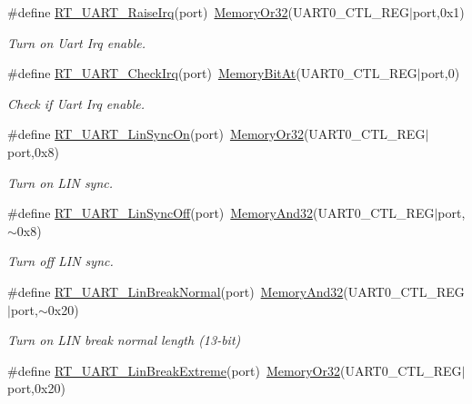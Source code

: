 \begin{DoxyCompactItemize}
\#define \mbox{\hyperlink{a00056_ad8934a303c429b70176995f2dd6ac67b}{R\+T\+\_\+\+U\+A\+R\+T\+\_\+\+Raise\+Irq}}(port)~\mbox{\hyperlink{a00020_a9ea92ebccdef6bdaca4d00210cc7266d}{Memory\+Or32}}(U\+A\+R\+T0\+\_\+\+C\+T\+L\+\_\+\+R\+EG$\vert$port,0x1)
\begin{DoxyCompactList}\small\item\em Turn on Uart Irq enable. \end{DoxyCompactList}\item 
\#define \mbox{\hyperlink{a00056_a3e29e879f76b82a13419f4d59a1c3053}{R\+T\+\_\+\+U\+A\+R\+T\+\_\+\+Check\+Irq}}(port)~\mbox{\hyperlink{a00020_aaa87daf3a7b5e127c21919e520e58282}{Memory\+Bit\+At}}(U\+A\+R\+T0\+\_\+\+C\+T\+L\+\_\+\+R\+EG$\vert$port,0)
\begin{DoxyCompactList}\small\item\em Check if Uart Irq enable. \end{DoxyCompactList}\item 
\#define \mbox{\hyperlink{a00056_a49f9d43f5fd87ceed952123010e015fa}{R\+T\+\_\+\+U\+A\+R\+T\+\_\+\+Lin\+Sync\+On}}(port)~\mbox{\hyperlink{a00020_a9ea92ebccdef6bdaca4d00210cc7266d}{Memory\+Or32}}(U\+A\+R\+T0\+\_\+\+C\+T\+L\+\_\+\+R\+EG$\vert$port,0x8)
\begin{DoxyCompactList}\small\item\em Turn on L\+IN sync. \end{DoxyCompactList}\item 
\#define \mbox{\hyperlink{a00056_aea01869278bc3c4e332af854c4e660be}{R\+T\+\_\+\+U\+A\+R\+T\+\_\+\+Lin\+Sync\+Off}}(port)~\mbox{\hyperlink{a00020_a5c1a2bd4c1bd4c2f429d8042a45327ff}{Memory\+And32}}(U\+A\+R\+T0\+\_\+\+C\+T\+L\+\_\+\+R\+EG$\vert$port,$\sim$0x8)
\begin{DoxyCompactList}\small\item\em Turn off L\+IN sync. \end{DoxyCompactList}\item 
\#define \mbox{\hyperlink{a00056_a45d1e1116c5b535f276acc73e522570f}{R\+T\+\_\+\+U\+A\+R\+T\+\_\+\+Lin\+Break\+Normal}}(port)~\mbox{\hyperlink{a00020_a5c1a2bd4c1bd4c2f429d8042a45327ff}{Memory\+And32}}(U\+A\+R\+T0\+\_\+\+C\+T\+L\+\_\+\+R\+EG$\vert$port,$\sim$0x20)
\begin{DoxyCompactList}\small\item\em Turn on L\+IN break normal length (13-\/bit) \end{DoxyCompactList}\item 
\#define \mbox{\hyperlink{a00056_a9e7d98206f07485a3347bab6672a971c}{R\+T\+\_\+\+U\+A\+R\+T\+\_\+\+Lin\+Break\+Extreme}}(port)~\mbox{\hyperlink{a00020_a9ea92ebccdef6bdaca4d00210cc7266d}{Memory\+Or32}}(U\+A\+R\+T0\+\_\+\+C\+T\+L\+\_\+\+R\+EG$\vert$port,0x20)

\end{DoxyCompactItemize}
